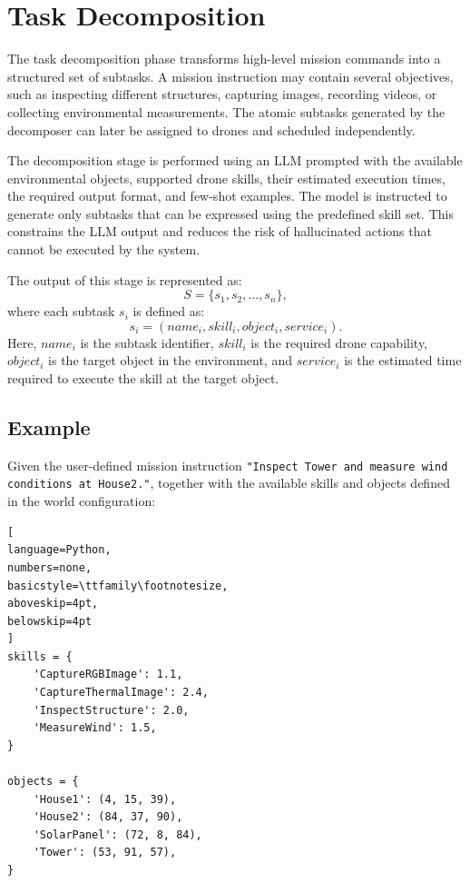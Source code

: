 \section{Task Decomposition}
The task decomposition phase transforms high-level mission commands into a structured set of subtasks.
A mission instruction may contain several objectives, such as inspecting different structures, capturing images, 
recording videos, or collecting environmental measurements.
The atomic subtasks generated by the decomposer can later be assigned to drones and scheduled independently.

The decomposition stage is performed using an LLM prompted with the available environmental objects, supported drone skills, 
their estimated execution times, the required output format, and few-shot examples.
The model is instructed to generate only subtasks that can be expressed using the predefined skill set.
This constrains the LLM output and reduces the risk of hallucinated actions that cannot be executed by the system.

The output of this stage is represented as:
\[
S = \{s_1, s_2, \dots, s_n\},
\]
where each subtask \(s_i\) is defined as:
\[
s_i = (name_i, skill_i, object_i, service_i).
\]
Here, \(name_i\) is the subtask identifier, \(skill_i\) is the required drone capability, \(object_i\) is the target object in the environment, 
and \(service_i\) is the estimated time required to execute the skill at the target object.

\subsection{Example}
\label{subsec:decomposition_example}
Given the user-defined mission instruction 
\texttt{"Inspect Tower and measure wind conditions at House2."}, 
together with the available skills and objects defined in the world configuration:

\noindent\begin{minipage}{\linewidth}
\begin{lstlisting}[
language=Python,
numbers=none,
basicstyle=\ttfamily\footnotesize,
aboveskip=4pt,
belowskip=4pt
]
skills = {
    'CaptureRGBImage': 1.1,
    'CaptureThermalImage': 2.4,
    'InspectStructure': 2.0,
    'MeasureWind': 1.5,
}

objects = {
    'House1': (4, 15, 39),
    'House2': (84, 37, 90),
    'SolarPanel': (72, 8, 84),
    'Tower': (53, 91, 57),
}
\end{lstlisting}
\end{minipage}


